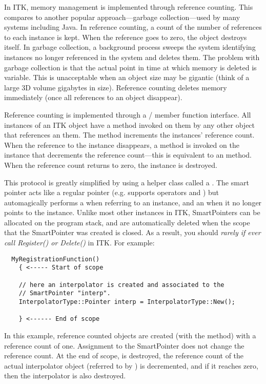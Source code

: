 In ITK, memory management is implemented through reference counting. This
compares to another popular approach---garbage collection---used
 by many
systems including Java. In reference counting, a count of the number of
references to each instance is kept. When the reference goes to zero, the
object destroys itself. In garbage collection, a background process sweeps
the system identifying instances no longer referenced in the system and
deletes them. The problem with garbage collection is that the actual point in
time at which memory is deleted is variable. This is unacceptable when an
object size may be gigantic (think of a large 3D volume gigabytes in
size). Reference counting deletes memory immediately (once all references to
an object disappear).

Reference counting is implemented through a /
member function interface.  All instances of an ITK object have a
 method invoked on them by any other object that references
an them. The  method increments the instances' reference
count. When the reference to the instance disappears, a 
method is invoked on the instance that decrements the reference count---this
is equivalent to an  method. When the reference count
returns to zero, the instance is destroyed.

This protocol is greatly simplified by using a helper class called a
. The smart pointer acts like a regular pointer
(e.g. supports operators \code{->} and \code{*}) but automagically performs a
 when referring to an instance, and an 
when it no longer points to the instance.  Unlike most other instances in
ITK, SmartPointers can be allocated on the program stack, and are
automatically deleted when the scope that the SmartPointer was created
is closed. As a result, you should \emph{rarely if ever call Register() or
Delete()} in ITK. For example:

\small
\begin{verbatim}
  MyRegistrationFunction()
    { <----- Start of scope

    // here an interpolator is created and associated to the
    // SmartPointer "interp".
    InterpolatorType::Pointer interp = InterpolatorType::New();

    } <------ End of scope
\end{verbatim}
\normalsize

In this example, reference counted objects are created (with the 
method) with a reference count of one. Assignment to the SmartPointer
 does not change the reference count. At the end of scope,
 is destroyed, the reference count of the actual interpolator
object (referred to by ) is decremented, and if it reaches zero,
then the interpolator is also destroyed.

